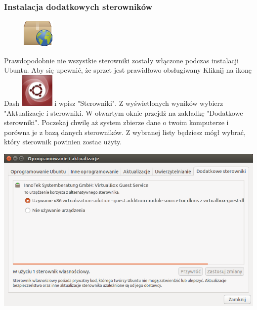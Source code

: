 \subsubsection{Instalacja dodatkowych sterowników}
\begin{figure}
	\includegraphics[width=\linewidth]{images/pierwsze_uruchomienie_driver1.png}
\end{figure}

Prawdopodobnie nie wszystkie sterowniki zostały włączone podczas instalacji Ubuntu. Aby się upewnić, że sprzet jest prawidłowo obsługiwany Kliknij na ikonę Dash \includegraphics[scale=0.35]{images/ikony_dash.png} i wpisz "Sterowniki". Z wyświetlonych wyników wybierz "Aktualizacje i sterowniki. W otwartym oknie przejdź na zakładkę "Dodatkowe sterowniki". Poczekaj chwilę aż system zbierze dane o twoim komputerze i porówna je z bazą danych sterowników. Z wybranej listy będziesz mógł wybrać, który sterownik powinien zostac użyty.

\begin{center}
	\includegraphics[scale=0.95]{images/pierwsze_uruchomienie_driver2.png}
\end{center}

